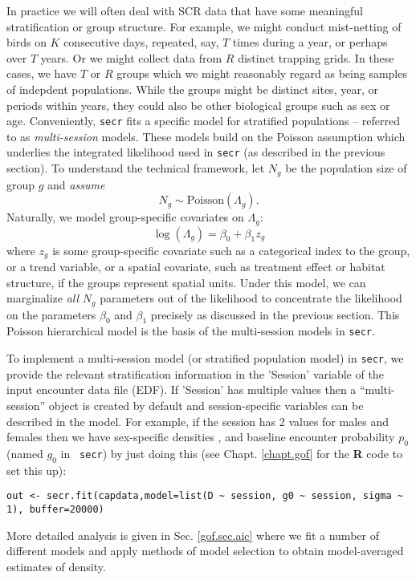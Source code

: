 In practice we will often deal with SCR data that have some meaningful
stratification or group structure.  For example, we might conduct
mist-netting of birds on $K$ consecutive days, repeated, say, $T$
times during a year, or perhaps over $T$ years. Or we might collect
data from $R$ distinct trapping grids.  In these cases, we have $T$ or
$R$ groups which we might reasonably regard as being samples of
indepdent populations.  While the groups might be distinct sites,
year, or periods within years, they could also be other biological
groups such as sex or age.  Conveniently, \mbox{\tt secr} fits a
specific model for stratified populations -- referred to as {\it
  multi-session} models. These models build on the Poisson assumption
which underlies the integrated likelihood used in \mbox{\tt secr} (as
described in the previous section).  To understand the technical
framework, let $N_{g}$ be the population size of group $g$ and {\it
  assume}
\[
 N_{g} \sim \mbox{Poisson}(\Lambda_{g}).
\]
Naturally, we model group-specific covariates on $\Lambda_{g}$:
\[
 \log(\Lambda_{g}) = \beta_{0} + \beta_{1} z_{g}
\]
where $z_{g}$ is some group-specific covariate such as a categorical index to the group, or a trend variable, or a spatial 
covariate, such as treatment effect or habitat structure, if the groups
represent spatial units. 
Under this model,  we can marginalize {\it all} $N_{g}$ parameters out
of the likelihood to concentrate the likelihood on the parameters
$\beta_{0}$ and $\beta_{1}$ precisely as discussed in the previous
section. This Poisson hierarchical model 
is the basis of the multi-session models in \mbox{\tt secr}.

To implement a multi-session model (or stratified population model) in
\mbox{\tt secr},
we provide the relevant stratification information in the 
 'Session' variable of the input encounter data file (EDF). If
 'Session' has multiple values then a
``multi-session'' object is created by default and session-specific variables can
be described in the model. For example, if the session has 2 values
for males and females then we have sex-specific densities , and
baseline encounter probability $p_{0}$ (named $g_{0}$  in \mbox{\tt
  secr}) by just doing this (see Chapt. \ref{chapt.gof} for the {\bf
  R} code to set this up):
\begin{verbatim}
out <- secr.fit(capdata,model=list(D ~ session, g0 ~ session, sigma ~ 1), buffer=20000)
\end{verbatim}
More detailed analysis is given in Sec. \ref{gof.sec.aic} where we fit
a number of different models and apply methods of model selection to
obtain model-averaged estimates of density.

